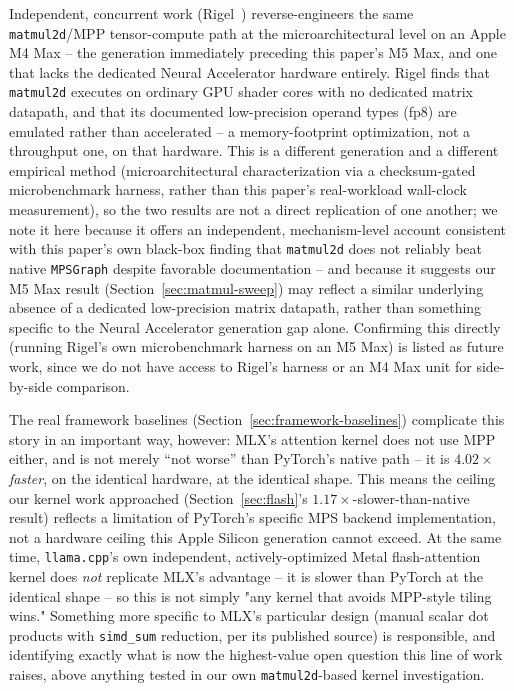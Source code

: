 \documentclass[11pt]{article}
\newcommand{\code}[1]{\texttt{#1}}
\begin{document}
Independent, concurrent work (Rigel~\cite{rigel}) reverse-engineers the same \code{matmul2d}/MPP
tensor-compute path at the microarchitectural level on an Apple M4 Max -- the generation
immediately preceding this paper's M5 Max, and one that lacks the dedicated Neural Accelerator
hardware entirely. Rigel finds that \code{matmul2d} executes on ordinary GPU shader cores with no
dedicated matrix datapath, and that its documented low-precision operand types (fp8) are emulated
rather than accelerated -- a memory-footprint optimization, not a throughput one, on that hardware.
This is a different generation and a different empirical method (microarchitectural
characterization via a checksum-gated microbenchmark harness, rather than this paper's
real-workload wall-clock measurement), so the two results are not a direct replication of one
another; we note it here because it offers an independent, mechanism-level account consistent with
this paper's own black-box finding that \code{matmul2d} does not reliably beat native
\code{MPSGraph} despite favorable documentation -- and because it suggests our M5 Max result
(Section~\ref{sec:matmul-sweep}) may reflect a similar underlying absence of a dedicated
low-precision matrix datapath, rather than something specific to the Neural Accelerator generation
gap alone. Confirming this directly (running Rigel's own microbenchmark harness on an M5 Max) is
listed as future work, since we do not have access to Rigel's harness or an M4 Max unit for
side-by-side comparison.

The real framework baselines (Section~\ref{sec:framework-baselines}) complicate this story in an
important way, however: MLX's attention kernel does not use MPP either, and is not merely
``not worse'' than PyTorch's native path -- it is $4.02\times$ \emph{faster}, on the identical
hardware, at the identical shape. This means the ceiling our kernel work approached
(Section~\ref{sec:flash}'s $1.17\times$-slower-than-native result) reflects a limitation of
PyTorch's specific MPS backend implementation, not a hardware ceiling this Apple Silicon
generation cannot exceed. At the same time, \code{llama.cpp}'s own independent, actively-optimized
Metal flash-attention kernel does \emph{not} replicate MLX's advantage -- it is slower than
PyTorch at the identical shape -- so this is not simply "any kernel that avoids MPP-style tiling
wins." Something more specific to MLX's particular design (manual scalar dot products with
\code{simd\_sum} reduction, per its published source) is responsible, and identifying exactly what
is now the highest-value open question this line of work raises, above anything tested in our own
\code{matmul2d}-based kernel investigation.
\end{document}
